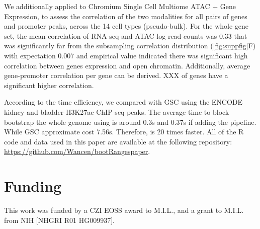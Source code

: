 We additionally applied
\bootranges to Chromium Single Cell Multiome ATAC + Gene Expression, to assess the correlation of the two modalities for all pairs of genes and promoter peaks, across the 14 cell types (pseudo-bulk).
For the whole gene set, the mean correlation of RNA-seq and ATAC log read counts was 0.33 that was significantly far from the subsampling correlation distribution (\cref{fig:suppfig}F) with expectation 0.007 and empirical value indicated there was significant high correlation between genes expression and open chromatin. Additionally, average gene-promoter correlation per gene can be derived. XXX of genes have a significant higher correlation. 


According to the time efficiency, we compared with GSC using the ENCODE kidney and bladder H3K27ac ChIP-seq peaks. The average time to block bootstrap the whole genome using \bootranges is around 0.3s and 0.37s if adding the \plyranges pipeline. While GSC approximate cost 7.56s. Therefore, \bootranges is 20 times faster.
All of the R code and data used in this paper are available at the following repository:
\url{https://github.com/Wancen/bootRangespaper}. 


  

\vspace*{-25pt}

\section*{Funding}
This work was funded by a CZI EOSS award to  M.I.L., and a grant to M.I.L. from NIH [NHGRI R01 HG009937].